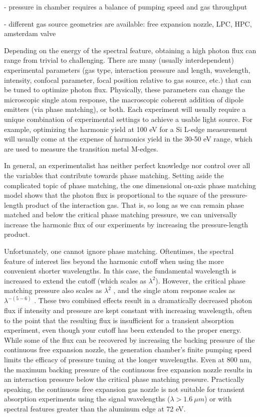 - pressure in chamber requires a balance of pumping speed and gas throughput

- different gas source geometries are available: free expansion nozzle, LPC, HPC, amsterdam valve

Depending on the energy of the spectral feature, obtaining a high photon flux can range from trivial to challenging. There are many (usually interdependent) experimental parameters (gas type, interaction pressure and length, wavelength, intensity, confocal parameter, focal position relative to gas source, etc.) that can be tuned to optimize photon flux. Physically, these parameters can change the microscopic single atom response, the macroscopic coherent addition of dipole emitters (via phase matching), or both. Each experiment will usually require a unique combination of experimental settings to achieve a usable light source. For example, optimizing the harmonic yield at 100 eV for a Si L-edge measurement will usually come at the expense of harmonics yield in the 30-50 eV range, which are used to measure the transition metal M-edges.

In general, an experimentalist has neither perfect knowledge nor control over all the variables that contribute towards phase matching. Setting aside the complicated topic of phase matching, the one dimensional on-axis phase matching model\cite{constantOptimizingHighHarmonic1999} shows that the photon flux is proportional to the square of the pressure-length product of the interaction gas. That is, so long as we can remain phase matched and below the critical phase matching pressure\cite{popmintchevPhaseMatchingHigh2009}, we can universally increase the harmonic flux of our experiments by increasing the pressure-length product.

Unfortunately, one cannot ignore phase matching. Oftentimes, the spectral feature of interest lies beyond the harmonic cutoff when using the more convenient shorter wavelengths. In this case, the fundamental wavelength is increased to extend the cutoff (which scales as $\lambda^2$). However, the critical phase matching pressure also scales as $\lambda^2$ \cite{popmintchevPhaseMatchingHigh2009}, and the single atom response scales as $\lambda^{-(5-6)}$ \cite{tateScalingWavePacketDynamics2007}. These two combined effects result in a dramatically decreased photon flux if intensity and pressure are kept constant with increasing wavelength, often to the point that the resulting flux is insufficient for a transient absorption experiment, even though your cutoff has been extended to the proper energy. While some of the flux can be recovered by increasing the backing pressure of the continuous free expansion nozzle, the generation chamber's finite pumping speed limits the efficacy of pressure tuning at the longer wavelengths. Even at 800 nm, the maximum backing pressure of the continuous free expansion nozzle results in an interaction pressure below the critical phase matching pressure. Practically speaking, the continuous free expansion gas nozzle is not suitable for transient absorption experiments using the signal wavelengths ($\lambda > 1.6 \ \mu m$) or with spectral features greater than the aluminum edge at 72 eV.

